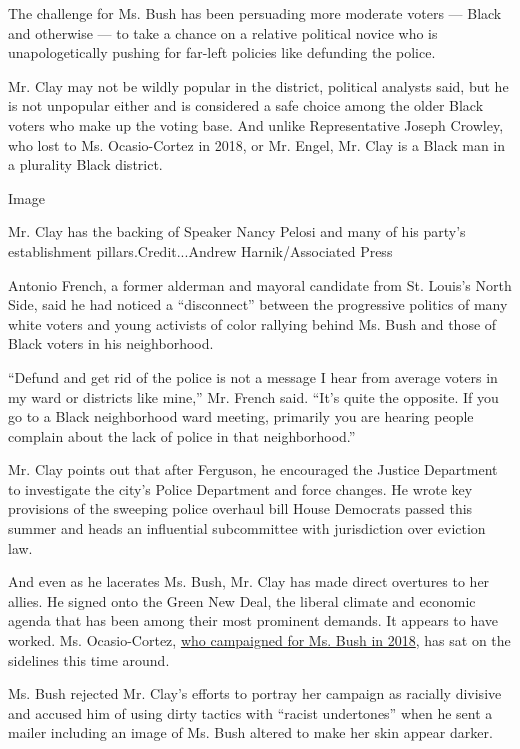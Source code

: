 The challenge for Ms. Bush has been persuading more moderate voters ---
Black and otherwise --- to take a chance on a relative political novice
who is unapologetically pushing for far-left policies like defunding the
police.

Mr. Clay may not be wildly popular in the district, political analysts
said, but he is not unpopular either and is considered a safe choice
among the older Black voters who make up the voting base. And unlike
Representative Joseph Crowley, who lost to Ms. Ocasio-Cortez in 2018, or
Mr. Engel, Mr. Clay is a Black man in a plurality Black district.

Image

Mr. Clay has the backing of Speaker Nancy Pelosi and many of his party's
establishment pillars.Credit...Andrew Harnik/Associated Press

Antonio French, a former alderman and mayoral candidate from St. Louis's
North Side, said he had noticed a ``disconnect'' between the progressive
politics of many white voters and young activists of color rallying
behind Ms. Bush and those of Black voters in his neighborhood.

``Defund and get rid of the police is not a message I hear from average
voters in my ward or districts like mine,'' Mr. French said. ``It's
quite the opposite. If you go to a Black neighborhood ward meeting,
primarily you are hearing people complain about the lack of police in
that neighborhood.''

Mr. Clay points out that after Ferguson, he encouraged the Justice
Department to investigate the city's Police Department and force
changes. He wrote key provisions of the sweeping police overhaul bill
House Democrats passed this summer and heads an influential subcommittee
with jurisdiction over eviction law.

And even as he lacerates Ms. Bush, Mr. Clay has made direct overtures to
her allies. He signed onto the Green New Deal, the liberal climate and
economic agenda that has been among their most prominent demands. It
appears to have worked. Ms. Ocasio-Cortez,
\href{https://www.nytimes.com/2018/08/05/us/politics/st-louis-cori-bush-ocasio-cortez.html}{who
campaigned for Ms. Bush in 2018}, has sat on the sidelines this time
around.

Ms. Bush rejected Mr. Clay's efforts to portray her campaign as racially
divisive and accused him of using dirty tactics with ``racist
undertones'' when he sent a mailer including an image of Ms. Bush
altered to make her skin appear darker.

